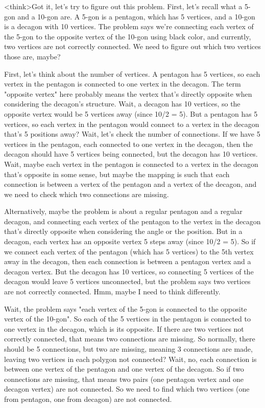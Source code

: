 <think>Got it, let's try to figure out this problem. First, let's recall what a 5-gon and a 10-gon are. A 5-gon is a pentagon, which has 5 vertices, and a 10-gon is a decagon with 10 vertices. The problem says we're connecting each vertex of the 5-gon to the opposite vertex of the 10-gon using black color, and currently, two vertices are not correctly connected. We need to figure out which two vertices those are, maybe?

First, let's think about the number of vertices. A pentagon has 5 vertices, so each vertex in the pentagon is connected to one vertex in the decagon. The term "opposite vertex" here probably means the vertex that's directly opposite when considering the decagon's structure. Wait, a decagon has 10 vertices, so the opposite vertex would be 5 vertices away (since 10/2 = 5). But a pentagon has 5 vertices, so each vertex in the pentagon would connect to a vertex in the decagon that's 5 positions away? Wait, let's check the number of connections. If we have 5 vertices in the pentagon, each connected to one vertex in the decagon, then the decagon should have 5 vertices being connected, but the decagon has 10 vertices. Wait, maybe each vertex in the pentagon is connected to a vertex in the decagon that's opposite in some sense, but maybe the mapping is such that each connection is between a vertex of the pentagon and a vertex of the decagon, and we need to check which two connections are missing.

Alternatively, maybe the problem is about a regular pentagon and a regular decagon, and connecting each vertex of the pentagon to the vertex in the decagon that's directly opposite when considering the angle or the position. But in a decagon, each vertex has an opposite vertex 5 steps away (since 10/2 = 5). So if we connect each vertex of the pentagon (which has 5 vertices) to the 5th vertex away in the decagon, then each connection is between a pentagon vertex and a decagon vertex. But the decagon has 10 vertices, so connecting 5 vertices of the decagon would leave 5 vertices unconnected, but the problem says two vertices are not correctly connected. Hmm, maybe I need to think differently.

Wait, the problem says "each vertex of the 5-gon is connected to the opposite vertex of the 10-gon". So each of the 5 vertices in the pentagon is connected to one vertex in the decagon, which is its opposite. If there are two vertices not correctly connected, that means two connections are missing. So normally, there should be 5 connections, but two are missing, meaning 3 connections are made, leaving two vertices in each polygon not connected? Wait, no, each connection is between one vertex of the pentagon and one vertex of the decagon. So if two connections are missing, that means two pairs (one pentagon vertex and one decagon vertex) are not connected. So we need to find which two vertices (one from pentagon, one from decagon) are not connected.

